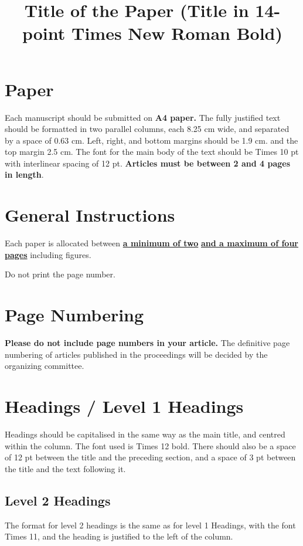 \documentclass[10pt, a4paper]{article}
\title{Title of the Paper (Title in 14-point Times New Roman Bold)\\ }
\begin{document}
\maketitleabstract

\section{Paper}

Each manuscript should be submitted on \textbf{A4 paper.} The fully
justified text should be formatted in two parallel columns, each 8.25 cm wide,
and separated by a space of 0.63 cm. Left, right, and bottom margins should be
1.9 cm. and the top margin 2.5 cm. The font for the main body of the text should
be Times 10 pt with interlinear spacing of 12 pt.  \textbf{Articles must be
between 2 and 4 pages in length}.

\section{General Instructions}

Each paper is allocated between \underline{\textbf{a mi\-ni\-mum of two}}
\textbf{\underline{and a maximum of four pages}} including figures. %

Do not print the page number.

\section{Page Numbering}

\textbf{Please do not include page numbers in your article.} The definitive page
numbering of articles published in the proceedings will be decided by the
organizing committee.

\section{Headings / Level 1 Headings}

Headings should be capitalised in the same way as the main title, and centred
within the column. The font used is Times 12 bold. There should also be a space
of 12 pt between the title and the preceding section, and a space of 3 pt
between the title and the text following it.

\subsection{Level 2 Headings}

The format for level 2 headings is the same as for level 1 Headings, with the
font Times 11, and the heading is justified to the left of the column.
\end{document}
